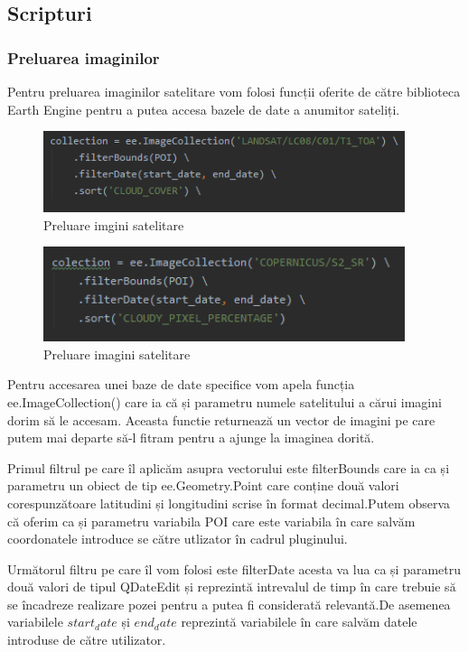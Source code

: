 \documentclass[12pt,a4paper]{article}
\theoremstyle{definition}
\theoremstyle{remark}
\begin{document}
\subsection{Scripturi}
\subsubsection{Preluarea imaginilor}

Pentru preluarea imaginilor satelitare vom folosi funcții oferite de către biblioteca Earth Engine pentru a putea accesa bazele de date a anumitor sateliți.

\begin{figure}[H]
  \centering
  \includegraphics[width=300pt]{landsatsatelit.png}
  \caption{Preluare imgini satelitare}   
\end{figure}


\begin{figure}[H]
  \centering
  \includegraphics[width=300pt]{sentinelsatelit.png}
  \caption{Preluare imagini satelitare}   
\end{figure}

Pentru accesarea unei baze de date specifice vom apela funcția ee.ImageCollection() care ia că și parametru numele satelitului a cărui imagini dorim să le accesam. Aceasta functie returnează un vector de imagini pe care putem mai departe să-l fitram pentru a ajunge la imaginea dorită. 

Primul filtrul pe care îl aplicăm asupra vectorului este filterBounds care ia ca și parametru un obiect de tip ee.Geometry.Point care conține două valori corespunzătoare latitudini și longitudini scrise în format decimal.Putem observa că oferim ca și parametru variabila POI care este variabila în care salvăm coordonatele introduce se către utlizator în cadrul pluginului.

Următorul filtru pe care îl vom folosi este filterDate acesta va lua ca și parametru două valori de tipul QDateEdit și reprezintă intrevalul de timp în care trebuie să se încadreze realizare pozei pentru a putea fi considerată relevantă.De asemenea variabilele $start_date$ și $end_date$ reprezintă variabilele în care salvăm datele introduse de către utilizator.
\end{document}
